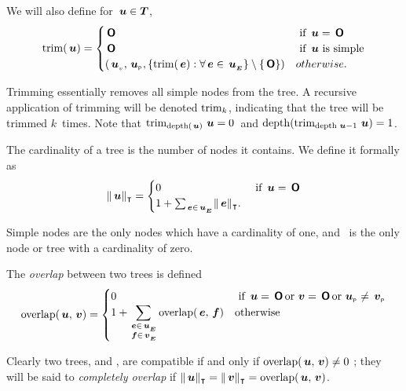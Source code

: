 \begin{definition}
  We will also define for \(\,\boldsymbol{u} \in \boldsymbol{T}\),
  \begin{align*}
      \operatorname{trim}(\,\boldsymbol{u}) = \begin{cases}
        \,\boldsymbol{\mathsf{O}} & \text{ if } \,\boldsymbol{u} = \,\boldsymbol{\mathsf{O}} \\
        \,\boldsymbol{\mathsf{O}} & \text{ if } \,\boldsymbol{u} \text{ is simple} \\
        ({{\,\boldsymbol{u}}_{{}_{v}}}, {{\,\boldsymbol{u}}_{{}_{\mathsf{P}}}}, {\lbrace \operatorname{trim}(\,\boldsymbol{e}): \forall\,\boldsymbol{e}\in{\,\boldsymbol{u}}_{{}_{\boldsymbol{E}}} \rbrace \setminus \{\,\boldsymbol{\mathsf{O}}\}}) & otherwise.
      \end{cases}
  \end{align*}
\end{definition}

Trimming essentially removes all simple nodes from the tree.   A recursive
application of trimming will be denoted \(\operatorname{trim}_{k}\), indicating that the tree  will be trimmed
\(k\)\ times. Note that \(\operatorname{trim}_{\operatorname{depth}(\,\boldsymbol{u})}{\,\boldsymbol{u}} = 0\)\ and \(\operatorname{depth}(\operatorname{trim}_{\operatorname{depth}{\,\boldsymbol{u}}-1}{\,\boldsymbol{u}}) =
1\).

\begin{definition}
  The cardinality of a tree is the number of nodes it contains. We define it formally as
  \begin{align*}
  \lVert{\,\boldsymbol{u}}\rVert_{\intercal} = \begin{cases}
    0 & \text{ if } \,\boldsymbol{u} = \,\boldsymbol{\mathsf{O}}\\
    1 + \sum_{\,\boldsymbol{e}\in{\,\boldsymbol{u}}_{{}_{\boldsymbol{E}}}} \lVert{\,\boldsymbol{e}}\rVert_{\intercal}.
    \end{cases}
  \end{align*}

Simple nodes are the only nodes which have a cardinality of one, and \tzerotree\ is the only node or tree with a
cardinality of zero.
\end{definition}



\begin{definition}
The \emph{overlap} between two trees is defined
\[
  \operatorname{overlap}(\,\boldsymbol{u},\,\boldsymbol{v}) = \begin{cases}
    0 & \text{ if } \,\boldsymbol{u} = \,\boldsymbol{\mathsf{O}} \operatorname{\text{or}} \,\boldsymbol{v} = \,\boldsymbol{\mathsf{O}} \operatorname{\text{or}} {\,\boldsymbol{u}}_{{}_{\mathsf{P}}} \neq {\,\boldsymbol{v}}_{{}_{\mathsf{P}}} \\
    1 + \displaystyle\sum_{\substack{\,\boldsymbol{e}\in{\,\boldsymbol{u}}_{{}_{\boldsymbol{E}}} \\ \,\boldsymbol{f}\in{\,\boldsymbol{v}}_{{}_{\boldsymbol{E}}}}} \operatorname{overlap}(\,\boldsymbol{e},\,\boldsymbol{f}) & \text{otherwise}
  \end{cases}
\]

Clearly two trees,  and , are compatible if and only if \(\operatorname{overlap}(\,\boldsymbol{u},\,\boldsymbol{v}) \neq 0 \) ; they will
be said to \emph{completely overlap} if \(\lVert{\,\boldsymbol{u}}\rVert_{\intercal} = \lVert{\,\boldsymbol{v}}\rVert_{\intercal} =
\operatorname{overlap}(\,\boldsymbol{u},\,\boldsymbol{v})\).
\end{definition}

